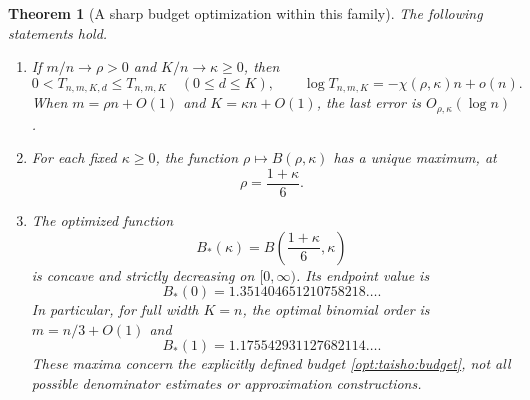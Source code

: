 \documentclass[11pt,a4paper]{article}
\numberwithin{equation}{section}
\newtheorem{theorem}{Theorem}[section]
\theoremstyle{definition}\newtheorem{definition}[theorem]{Definition}
\theoremstyle{remark}\newtheorem{remark}[theorem]{Remark}
\begin{document}
\begin{theorem}[A sharp budget optimization within this family]
\label{opt:taisho:main}
The following statements hold.
\begin{enumerate}
\item If $m/n\to\rho>0$ and $K/n\to\kappa\ge0$, then
\[
 0<T_{n,m,K,d}\le T_{n,m,K}\quad(0\le d\le K),\qquad
 \log T_{n,m,K}=-\chi(\rho,\kappa)n+o(n).
\]
When $m=\rho n+O(1)$ and $K=\kappa n+O(1)$, the last error is
$O_{\rho,\kappa}(\log n)$.
\item For each fixed $\kappa\ge0$, the function
$\rho\mapsto B(\rho,\kappa)$ has a unique maximum, at
\[
                       \rho=\frac{1+\kappa}{6}.
\]
\item The optimized function
\[
 B_*(\kappa)=B\left(\frac{1+\kappa}{6},\kappa\right)
\]
is concave and strictly decreasing on $[0,\infty)$. Its endpoint value is
\[
 B_*(0)=1.351404651210758218\ldots.
\]
In particular, for full width $K=n$, the optimal binomial order is
$m=n/3+O(1)$ and
\[
 B_*(1)=1.175542931127682114\ldots.
\]
These maxima concern the explicitly defined budget
\eqref{opt:taisho:budget}, not all possible denominator estimates or
approximation constructions.
\end{enumerate}
\end{theorem}
\end{document}
